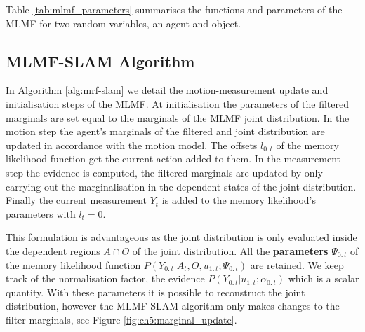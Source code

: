 Table \ref{tab:mlmf_parameters} summarises the functions and parameters of the MLMF for two random variables, an agent and object.
\begin{table}[h]
\centering
{}
\caption{MLMF functions with associated parameters. The marginal parameters are the discretisation of the 
state space $\boldsymbol{\theta} \in \mathbb{R}^N$, $\boldsymbol{\theta}^{(s)}$ correspond to the probability being in state $s$.}
\label{tab:mlmf_parameters}
\end{table}
\FloatBarrier
\subsection{MLMF-SLAM Algorithm}

In Algorithm \ref{alg:mrf-slam} we detail the motion-measurement update  and initialisation steps of the MLMF.
At initialisation the parameters of the filtered marginals are set equal to the marginals of the MLMF joint distribution.
In the motion step the agent's marginals of the filtered and joint distribution are updated in 
accordance with the motion model. The offsets $l_{0:t}$ of the memory likelihood function get the current action added 
to them. In the measurement step the evidence is computed, the filtered marginals are updated by only carrying out 
the marginalisation in the dependent states of the joint distribution. Finally the current measurement $Y_t$ is added
to the memory likelihood's parameters with $l_t=0$.

This formulation is advantageous as the joint distribution is only evaluated inside the dependent regions 
$A\cap O$ of the joint distribution. All the \textbf{parameters} $\Psi_{0:t}$ of the memory likelihood function
$P(Y_{0:t}|A_t,O,u_{1:t};\Psi_{0:t})$ are retained. We keep track of the normalisation factor, the evidence 
$P(Y_{0:t}|u_{1:t};\alpha_{0:t})$ which is a scalar quantity. 
With these parameters it is possible to reconstruct the joint distribution, however the MLMF-SLAM algorithm only
makes changes to the filter marginals, see Figure \ref{fig:ch5:marginal_update}. 

